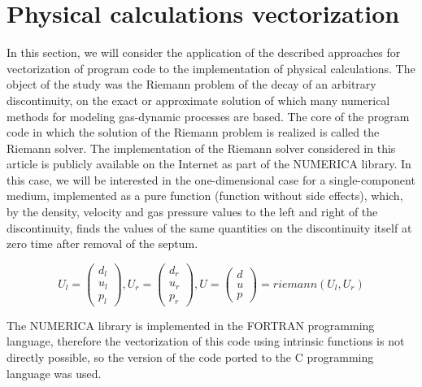 \documentclass[
11pt,%
tightenlines,%
twoside,%
onecolumn,%
nofloats,%
nobibnotes,%
nofootinbib,%
superscriptaddress,%
noshowpacs,%
centertags]%
{revtex4}
\begin{document}
\section{Physical calculations vectorization}

In this section, we will consider the application of the described approaches for vectorization of program code to the implementation of physical calculations.
The object of the study was the Riemann problem of the decay of an arbitrary discontinuity, on the exact or approximate solution of which many numerical methods for modeling gas-dynamic processes are based.
The core of the program code in which the solution of the Riemann problem is realized is called the Riemann solver.
The implementation of the Riemann solver considered in this article is publicly available on the Internet as part of the NUMERICA library.
In this case, we will be interested in the one-dimensional case for a single-component medium, implemented as a pure function (function without side effects), which, by the density, velocity and gas pressure values to the left and right of the discontinuity, finds the values of the same quantities on the discontinuity itself at zero time after removal of the septum.

\begin{equation}\label{eq:riemann}
U_l = \left( \begin{array}{ccc} d_l \\ u_l \\ p_l \end{array} \right),
U_r = \left( \begin{array}{ccc} d_r \\ u_r \\ p_r \end{array} \right),
U = \left( \begin{array}{ccc} d \\ u \\ p \end{array} \right) = riemann(U_l, U_r)
\end{equation}

The NUMERICA library is implemented in the FORTRAN programming language, therefore the vectorization of this code using intrinsic functions is not directly possible, so the version of the code ported to the C programming language was used.
\end{document}
